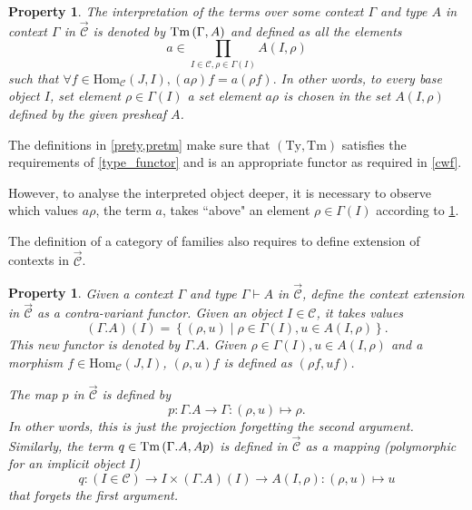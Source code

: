 \documentclass[12pt,a4paper,twoside,xetex]{book} %
\newtheorem{property}[theorem]{Property}
\newcommand{\psh}[1]{\overrightarrow{#1}}
\begin{document}
\begin{property}\label{pretm}
The interpretation of the terms over some context $\Gamma$ and type $A$ in 
context $\Gamma$ in $\psh{\mathcal{C}}$ is denoted by  $\text{Tm}\left(\Gamma,A\right)$ and defined as all the elements $$a 
\in \prod _{I \in \mathcal{C}, \rho \in \Gamma (I)} A(I,\rho)$$ such that 
$\forall f \in \text{Hom}_{\mathcal{C}}(J,I), (a \rho )f = a(\rho f).$ In other 
words, to every base object $I$, set element $\rho \in \Gamma (I)$ a set 
element $a\rho$ is chosen in the set $A(I,\rho)$ defined by the given presheaf 
$A$. 

\end{property}

The definitions in \cref{prety,pretm} make sure that $(\text{Ty},\text{Tm})$  
satisfies the requirements of \cref{type_functor} and is an appropriate functor 
as required in \cref{cwf}.


However, to analyse the interpreted object deeper, it is necessary to 
observe which values $a\rho$, the term $a$, takes ``above" an element $\rho 
\in \Gamma (I)$ according to \cref{pretm}.

The definition of a category of families also requires to define extension 
of contexts in $\psh{\mathcal{C}}$. 

\begin{property}\label{preext}
Given a context $\Gamma$ and type $\Gamma \vdash A$ in $\psh{\mathcal{C}}$, define the context 
extension in $\psh{\mathcal{C}}$ as a contra-variant functor. Given an object $I 
\in \mathcal{C}$, it takes values $$(\Gamma . A)(I) = \left\{ (\rho , u) \mid 
\rho \in \Gamma (I) , u \in A (I, \rho ) \right\}.$$ This new functor is 
denoted by $\Gamma . A$. Given $\rho \in \Gamma (I), u \in A(I,\rho )$ and a 
morphism $f \in \text{Hom}_{\mathcal{C}}(J,I)$, $(\rho, u)f$ is defined as 
$(\rho f, uf)$. 


The map $p$ in $\psh{\mathcal{C}}$ is defined by $$p: \Gamma . A \rightarrow 
\Gamma : (\rho , u ) \mapsto \rho.$$ In other words, this is just the 
projection forgetting the second argument. Similarly, the term $q \in 
\text{Tm}\left(\Gamma . A,Ap\right) $ is defined in $\psh{\mathcal{C}}$ as a mapping 
(polymorphic for an implicit object $I$) $$q: (I \in \mathcal{C}) \rightarrow I 
\times (\Gamma . A)(I) \rightarrow A(I,\rho): (\rho, u) \mapsto u$$ that 
forgets the first argument.
\end{property}
\end{document}
